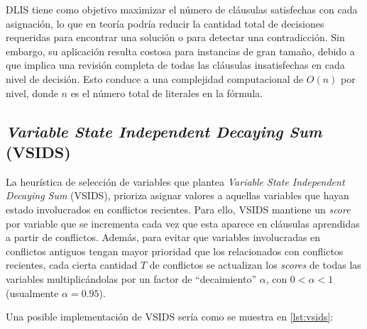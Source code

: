 

DLIS tiene como objetivo maximizar el número de cláusulas satisfechas con cada asignación, lo que en teoría podría reducir la cantidad total de decisiones requeridas para encontrar una solución o para detectar una contradicción. Sin embargo, su aplicación resulta costosa para instancias de gran tamaño, debido a que implica una revisión completa de todas las cláusulas insatisfechas en cada nivel de decisión. Esto conduce a una complejidad computacional de $O(n)$ por nivel, donde $n$ es el número total de literales en la fórmula.


\subsection{\textit{Variable State Independent Decaying Sum} (VSIDS)}
\label{subsec:vsids}

La heurística de selecci\'on de variables que plantea \textit{Variable State Independent Decaying Sum} (VSIDS), prioriza asignar valores a aquellas variables que hayan estado involucrados en conflictos recientes. Para ello, VSIDS mantiene un \textit{score} por variable que se incrementa cada vez que esta aparece en cláusulas aprendidas a partir de conflictos. Además, para evitar que variables involucradas en conflictos antiguos tengan mayor prioridad que los relacionados con conflictos recientes, cada cierta cantidad \( T \) de conflictos se actualizan los \textit{scores} de todas las variables multiplicándolas por un factor de ``decaimiento'' \(\alpha\), con \(0 < \alpha < 1\) (usualmente \(\alpha = 0.95\)). 

Una posible implementaci\'on de VSIDS ser\'ia como se muestra en \ref{lst:vsids}:


